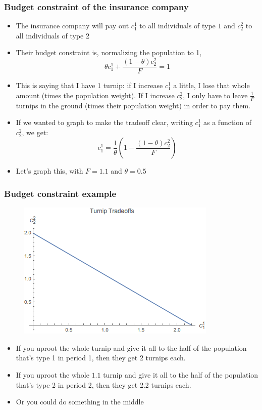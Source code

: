 \documentclass{beamer}
\begin{document}
\begin{frame}
\frametitle{Budget constraint of the insurance company}
\begin{itemize}
\item<1-> The insurance company will pay out $c_1^1$ to all individuals of type $1$ and $c_2^2$ to all individuals of type 2
\bigskip
\item<2-> Their budget constraint is, normalizing the population to 1,
$$\theta c_1^1 + \frac{(1-\theta)c_2^2}{F}=1$$
\bigskip
\item<3-> This is saying that I have 1 turnip: if I increase $c_1^1$ a little, I lose that whole amount (times the population weight).  If I increase $c_2^2$, I only have to leave $\frac{1}{F}$ turnips in the ground (times their population weight) in order to pay them.
\bigskip
\item<4-> If we wanted to graph to make the tradeoff clear, writing $c_1^1$ as a function of $c_2^2$, we get: 
$$c_1^1=\frac{1}{\theta}\left(1- \frac{(1-\theta)c_2^2}{F}\right)$$
\item<5-> Let's graph this, with $F=1.1$ and $\theta=0.5$
\end{itemize}
\end{frame}

\begin{frame}
\frametitle{Budget constraint example}
\begin{figure}
\centering
\includegraphics[scale=0.5]{Figures/turniptradeoff.png}
\end{figure}
\begin{itemize}
\item<2-> If you uproot the whole turnip and give it all to the half of the population that's type 1 in period 1, then they get 2 turnips each.
\smallskip 
\item<3-> If you uproot the whole $1.1$ turnip and give it all to the half of the population that's type 2 in period 2, then they get 2.2 turnips each.
\smallskip
\item<4-> Or you could do something in the middle
\end{itemize}
\end{frame}
\end{document}
